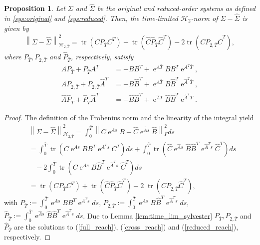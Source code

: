 \documentclass[a4paper,11pt, twoside]{article}
\newcommand{\expn}{\operatorname{e}}
\newcommand{\trace}{\operatorname{tr}}
\newtheorem{prop}[defn]{Proposition} %
\begin{document}
\begin{prop}\label{prop:reach_rep}
	Let $\Sigma$ and $\hat \Sigma$ be the original and reduced-order systems as defined in \eqref{sys:original} and \eqref{sys:reduced}. Then, 
the time-limited $\mathcal H_2$-norm of $\Sigma-\hat{\Sigma}$ is given by 
\begin{align}\label{eq:errorequation}
\left\|\Sigma-\hat\Sigma\right\|^2_{\mathcal H_{2, \bar T}}=\trace(C P_{\bar T} C^T)+  \trace(\hat C \hat P_{\bar T} \hat C^T) - 2 
\trace(C P_{2, \bar T} \hat C^T),                                          
\end{align}
where  $P_{\bar T}, P_{2, \bar T}$ and $\hat P_{\bar T}$, respectively, satisfy 
\begin{align}\label{full_reach}
A P_{\bar T}+ P_{\bar T} A^T &=-B B^T+\expn^{A \bar T}B B^T \expn^{A^T \bar T},\\ \label{cross_reach}
A P_{2, {\bar T}}+ P_{2, {\bar T}} \hat A^T &=-B \hat B^T+\expn^{A \bar T}B \hat B^T \expn^{\hat A^T \bar T}, \\ \label{reduced_reach}
\hat A \hat P_{\bar T}+\hat P_{\bar T} \hat A^T &=-\hat B \hat B^T+\expn^{\hat A \bar T}\hat B \hat B^T \expn^{\hat A^T \bar T}.                     
\end{align}
\end{prop}
 \begin{proof}
 The definition of the Frobenius norm and the linearity of the integral yield {\allowdisplaybreaks \begin{align*}
 &\left\|\Sigma-\hat\Sigma\right\|^2_{\mathcal H_{2, \bar T}}= \int_0^{\bar T} \left\|C \expn^{As} B - \hat C \expn^{\hat As} \hat B\right\|_F^2 
ds\\&
=\int_0^{\bar T} \trace\left(C \expn^{As}BB^T \expn^{A^Ts} C^T\right)ds+\int_0^{\bar T}\trace\left(\hat C \expn^{\hat As}\hat 
B\hat B^T\expn^{\hat A^Ts}  \hat C^T\right)ds\\&\ \ \ \ -2\int_0^{\bar T}\trace\left(C \expn^{As}B\hat B^T \expn^{\hat A^Ts} \hat C^T\right) 
ds\\&=\trace\left(C P_{\bar T} C^T\right)+\trace\left(\hat C \hat P_{\bar T} \hat C^T\right)-2\;\trace\left(C P_{2, {\bar T}} \hat C^T\right),
\end{align*}}
with $P_{\bar T}:=\int_0^{\bar T}  \expn^{As}BB^T \expn^{A^Ts}ds$, $P_{2, \bar T}:=\int_0^{\bar T}  \expn^{As}B\hat B^T \expn^{\hat A^Ts}ds$, $\hat 
P_{\bar T}:=\int_0^{\bar T} \expn^{\hat As}\hat B\hat B^T\expn^{\hat A^Ts} ds$.
Due to Lemma \ref{lem:time_lim_sylvester} $P_{\bar T}, P_{2, \bar T}$ and $\hat P_{\bar T}$ are the solutions to (\ref{full_reach}), 
(\ref{cross_reach}) and (\ref{reduced_reach}), respectively.
 \end{proof}
\end{document}
